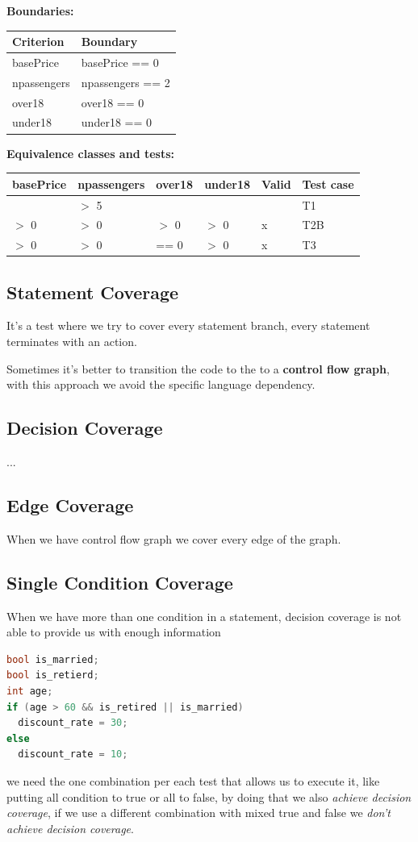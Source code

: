 \documentclass[12pt]{article}
\begin{document}
\textbf{Boundaries:}
\begin{center}
  \begin{tabular}{|l|l|}
    \hline
    Criterion & Boundary \\
    \hline
    basePrice & basePrice == 0 \\
    \hline
    npassengers & npassengers == 2 \\
    \hline
    over18 & over18 == 0 \\
    \hline
    under18 & under18 == 0 \\
    \hline
  \end{tabular}
\end{center}
\textbf{Equivalence classes and tests:}
\begin{center}
  \begin{tabular}{|l|l|l|l|l|l|}
    \hline
    basePrice & npassengers & over18 & under18 & Valid & Test case \\
    \hline
     & $>$ 5 & & & & T1 \\
     \hline
     $>$ 0 & $>$ 0 & $>$ 0 & $>$ 0 & x & T2B \\
    \hline
     $>$ 0 & $>$ 0 & == 0 & $>$ 0 & x & T3 \\
    \hline
  \end{tabular}
\end{center}

\subsection{Statement Coverage}
It's a test where we try to cover every statement branch, every statement terminates with an action.

Sometimes it's better to transition the code to the to a \textbf{control flow graph}, with this approach we avoid the specific language dependency.

\subsection{Decision Coverage}
...

\subsection{Edge Coverage}
When we have control flow graph we cover every edge of the graph.

\subsection{Single Condition Coverage}
When we have more than one condition in a statement, decision coverage is not able to provide us with enough information
\begin{lstlisting}[language=c]
bool is_married;
bool is_retierd;
int age;
if (age > 60 && is_retired || is_married)
  discount_rate = 30;
else
  discount_rate = 10;
\end{lstlisting}
we need the one combination per each test that allows us to execute it, like putting all condition to true or all to false, by doing that we also \emph{achieve decision coverage}, if we use a different combination with mixed true and false we \emph{don't achieve decision coverage}.
\end{document}

